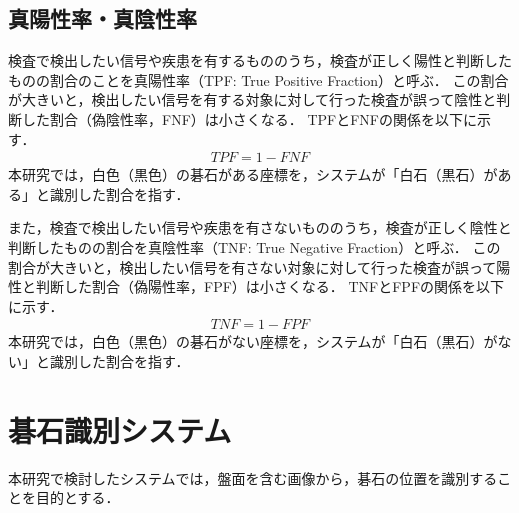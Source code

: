 \documentclass[openright]{nitocs}
\numberwithin{equation}{section}
\begin{document}
        \subsection{真陽性率・真陰性率} %
        検査で検出したい信号や疾患を有するもののうち，検査が正しく陽性と判断したものの割合のことを真陽性率（TPF: True Positive Fraction）と呼ぶ．
        この割合が大きいと，検出したい信号を有する対象に対して行った検査が誤って陰性と判断した割合（偽陰性率，FNF）は小さくなる．
        TPFとFNFの関係を以下に示す．
        \begin{align}
            TPF = 1-FNF
        \end{align}
        本研究では，白色（黒色）の碁石がある座標を，システムが「白石（黒石）がある」と識別した割合を指す．

        また，検査で検出したい信号や疾患を有さないもののうち，検査が正しく陰性と判断したものの割合を真陰性率（TNF: True Negative Fraction）と呼ぶ．
        この割合が大きいと，検出したい信号を有さない対象に対して行った検査が誤って陽性と判断した割合（偽陽性率，FPF）は小さくなる．
        TNFとFPFの関係を以下に示す．
        \begin{align}
            TNF = 1-FPF
        \end{align}
        本研究では，白色（黒色）の碁石がない座標を，システムが「白石（黒石）がない」と識別した割合を指す．



    \section{碁石識別システム} %
    \label{system}
        本研究で検討したシステムでは，盤面を含む画像から，碁石の位置を識別することを目的とする．
\end{document}

